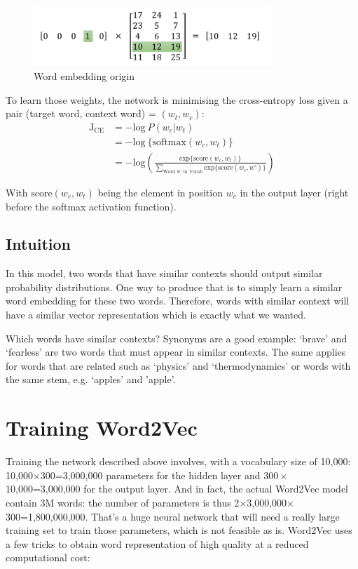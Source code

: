 \begin{figure}[H]
    \centering
    \includegraphics[width=0.8\textwidth]{Images/onehot-matrix.png}
    \caption{Word embedding origin\cite{word2vec-architecture}}
\end{figure}

\newpage
To learn those weights, the network is minimising the cross-entropy loss given a pair (target word, context word) = $(w_t, w_c)$:
\begin{align}
    \text{J}_{\text{CE}}   &=  -\text{log}~P(w_c | w_t) \nonumber\\
    &= -\text{log}~\{\text{softmax}(w_c, w_t)\}\nonumber\\
    &= -\text{log}\left(\frac{\text{exp}\{\text{score}(w_c, w_t)\}}{\sum_{\text{Word w' in Vocab}}\text{exp}\{\text{score}(w_c, w')\}} \right)
    \label{cross-entropy}
\end{align}

With $\text{score}(w_c, w_t)$ being the element in position $w_c$ in the output layer (right before the softmax activation function).

\subsection{Intuition}
In this model, two words that have similar contexts should output similar probability distributions. One way to produce that is to simply learn a similar word embedding for these two words. Therefore, words with similar context will have a similar vector representation which is exactly what we wanted.

Which words have similar contexts? Synonyms are a good example: `brave' and `fearless' are two words that must appear in similar contexts. The same applies for words that are related such as `physics' and `thermodynamics' or words with the same stem, e.g. `apples' and 'apple'. 

\newpage
\section{Training Word2Vec}
Training the network described above involves, with a vocabulary size of 10,000: 10,000$\times300$=3,000,000 parameters for the hidden layer and $300\times$10,000=3,000,000 for the output layer. And in fact, the actual Word2Vec model contain 3M words: the number of parameters is thus 2$\times$3,000,000$\times$300=1,800,000,000. That's a huge neural network that will need a really large training set to train those parameters, which is not feasible as is. Word2Vec uses a few tricks to obtain word representation of high quality at a reduced computational cost:

